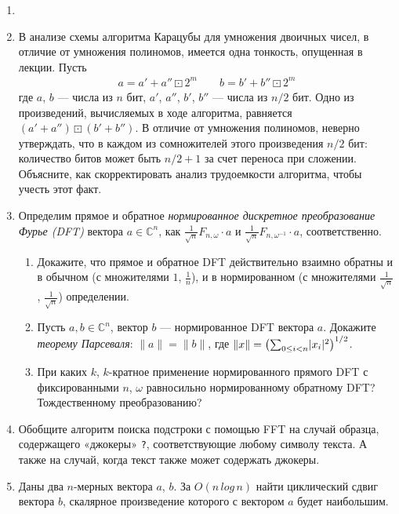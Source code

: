 \documentclass[11pt]{article}
\newenvironment{exercise}{\item}{}
\newcommand{\w}{\omega}
\newcommand{\Compl}{\mathbb{C}}
\newcommand{\norm}[1]{\lVert#1\rVert}
\newcommand{\bigpa}[1]{\bigl(#1\bigr)}
\begin{document}
\begin{enumerate}
\begin{exercise}
\end{exercise}

\begin{exercise}
В анализе схемы алгоритма Карацубы для умножения двоичных чисел, 
в отличие от умножения полиномов, имеется одна тонкость, опущенная в лекции.
Пусть 
{\small
\begin{gather*} 
a = a' + a'' \boxdot 2^m\qquad
b = b' + b'' \boxdot 2^m
\end{gather*}}%
%
где $a$, $b$ --- числа из $n$ бит, $a'$, $a''$, $b'$, $b''$ --- числа из $n/2$ бит.
Одно из произведений, вычисляемых в ходе алгоритма, равняется $(a' + a'') \boxdot (b' + b'')$.
В отличие от умножения полиномов, неверно утверждать, 
что в каждом из сомножителей этого произведения $n/2$ бит:
количество битов может быть $n/2+1$ за счет переноса при сложении.
Объясните, как скорректировать анализ трудоемкости алгоритма, чтобы учесть этот факт.
\end{exercise}

\begin{exercise}
Определим прямое и обратное \emph{нормированное дискретное преобразование Фурье (DFT)} вектора $a \in\Compl^n$,
как $\frac{1}{\sqrt{n}} F_{n,\w} \cdot a$ и $\frac{1}{\sqrt{n}} F_{n,\w^{-1}} \cdot a$, 
соответственно. 
%
\begin{enumerate}
%
\item Докажите, что прямое и обратное DFT действительно взаимно обратны
и в обычном (с множителями $1$, $\frac{1}{n}$), и в нормированном 
(с множителями $\frac{1}{\sqrt{n}}$, $\frac{1}{\sqrt{n}}$) определении.
%
\item Пусть $a,b \in\Compl^n$, вектор $b$ --- нормированное DFT вектора $a$.
Докажите \emph{теорему Парсеваля}: $\norm{a} = \norm{b}$, 
где $\norm{x} = \bigpa{\sum_{0 \leq i < n} \abs{x_i}^2}^{1/2}$.
%
\item При каких $k$, $k$-кратное применение нормированного прямого DFT
с фиксированными $n$, $\w$ равносильно нормированному обратному DFT? 
Тождественному преобразованию?
%
\end{enumerate}
\end{exercise}

\begin{exercise}
    Обобщите алгоритм поиска подстроки с помощью FFT на случай образца, содержащего «джокеры» \verb!?!, соответствующие любому символу текста. А также на случай, когда текст также может содержать джокеры.
\end{exercise}

\begin{exercise}
    Даны два \(n\)-мерных вектора \(a\), \(b\). За $O(n\, log\, n)$ найти циклический сдвиг вектора \(b\), скалярное произведение которого с вектором \(a\) будет наибольшим.
\end{exercise}

\end{enumerate}
\end{document}
